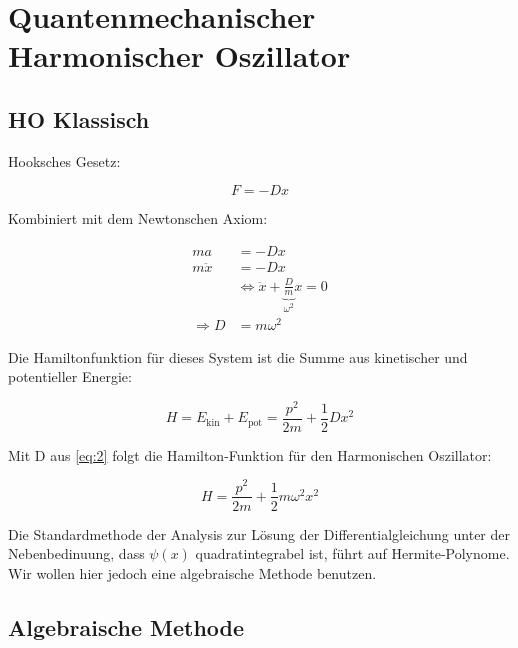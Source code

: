 



\section*{Quantenmechanischer Harmonischer Oszillator}

\subsection*{HO Klassisch}


Hooksches Gesetz:

\begin{equation}
  \label{eq:1}
  F = -Dx
\end{equation}

Kombiniert mit dem Newtonschen Axiom:

\begin{align}
  ma &= -Dx  \\
  m\ddot x &= -Dx \\
&\Leftrightarrow \ddot x + \underbrace{\frac{D}{m}}_{\omega^2}x = 0 \\
\Rightarrow D &= m\omega^2\label{eq:2}
\end{align}

Die Hamiltonfunktion für dieses System ist die Summe aus kinetischer und potentieller Energie:

\begin{equation}
  \label{eq:3}
  H = E_{\text{kin}}+E_{\text{pot}} = \frac{p^2}{2m} + \frac{1}{2}Dx^2
\end{equation}

Mit D aus \eqref{eq:2} folgt die Hamilton-Funktion für den Harmonischen Oszillator:

\begin{equation}
  \label{eq:4}
  \boxed{ H = \frac{p^2}{2m} +  \frac{1}{2}m\omega^2x^2}
\end{equation}


Die Standardmethode der Analysis zur Lösung der Differentialgleichung unter der Nebenbedinuung, dass \(\psi(x)\) quadratintegrabel ist, führt auf Hermite-Polynome. Wir wollen hier jedoch eine algebraische Methode benutzen.

\subsection*{Algebraische Methode}

